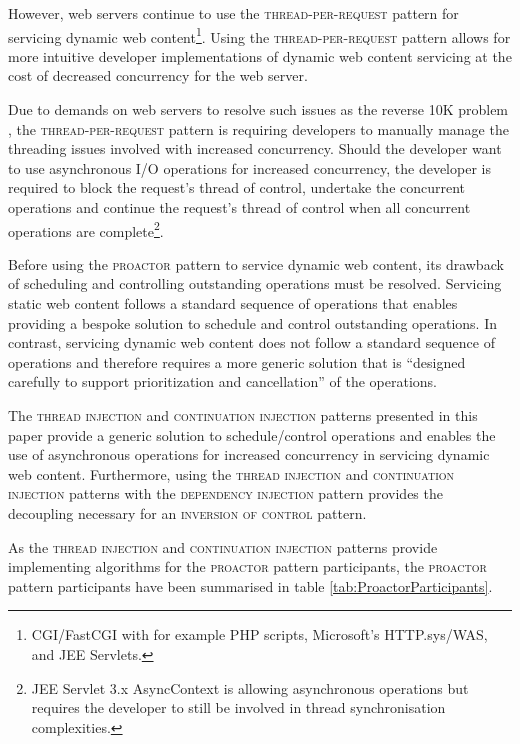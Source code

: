 \documentclass[prodmode]{style/acmlarge}
\begin{document}
However, web servers continue to use the \textsc{thread-per-request} pattern for
servicing dynamic web content\footnote{CGI/FastCGI with for example PHP scripts,
Microsoft's HTTP.sys/WAS, and JEE Servlets.}.  Using the
\textsc{thread-per-request} pattern allows for more intuitive developer
implementations of dynamic web content servicing at the cost of decreased
concurrency for the web server.

Due to demands on web servers to resolve such issues as the reverse 10K problem
\cite{reverse-ten-k-problem}, the \textsc{thread-per-request} pattern is
requiring developers to manually manage the threading issues involved with
increased concurrency.  Should the developer want to use asynchronous I/O
operations for increased concurrency, the developer is required to block the
request's thread of control, undertake the concurrent operations and continue
the request's thread of control when all concurrent operations are
complete\footnote{JEE Servlet 3.x AsyncContext is allowing asynchronous
operations but requires the developer to still be involved in thread
synchronisation complexities.}.

Before using the \textsc{proactor} pattern to service dynamic web content, its
drawback of scheduling and controlling outstanding operations \cite[p.
8]{proactor} must be resolved.  Servicing static web content follows a standard
sequence of operations that enables providing a bespoke solution to schedule and
control outstanding operations.  In contrast, servicing dynamic web content does
not follow a standard sequence of operations and therefore requires a more
generic solution that is ``designed carefully to support prioritization and
cancellation'' \cite[p. 8]{proactor} of the operations.

The \textsc{thread injection} and \textsc{continuation injection} patterns
presented in this paper provide a generic solution to schedule/control
operations and enables the use of asynchronous operations for increased
concurrency in servicing dynamic web content.  Furthermore, using the
\textsc{thread injection} and \textsc{continuation injection} patterns with the
\textsc{dependency injection} pattern \cite{ioc} provides the decoupling
necessary for an \textsc{inversion of control} pattern.

As the \textsc{thread injection} and \textsc{continuation injection} patterns provide implementing
algorithms for the \textsc{proactor} pattern participants, the \textsc{proactor}
pattern participants have been summarised in table
\ref{tab:ProactorParticipants}.
\end{document}
